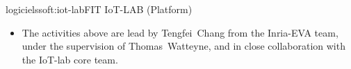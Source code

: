 \documentclass{ra2016}
\begin{document}
\begin{module}{logiciels}{soft:iot-lab}{FIT IoT-LAB (Platform)}
\begin{itemize}
    \begin{itemize}
        \item Allow commercial hardware to be plugged into the IoT-lab gateways.
        \item Allow multiple motes to be plugged into the same IoT-lab gateway.
        \item Use the IoT-lab for deploying and verifying the correct functioning of the OpenWSN implementation on all supported hardware board.
        \item Use the IoT-lab for deploying and verifying the correct functioning of the OpenWSN implementation at small/medium/large scale.
    \end{itemize}
    \item The activities above are lead by Tengfei~Chang from the Inria-EVA team, under the supervision of Thomas~Watteyne, and in close collaboration with the IoT-lab core team.
\end{itemize}

\end{module}



\end{document}
